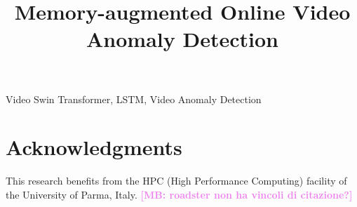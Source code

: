 \documentclass{article}
\title{Memory-augmented Online Video Anomaly Detection}
\newcommand{\mnote}[1]{\textcolor{violet}{\textbf{[MB: #1]}}}
\begin{document}
%
\maketitle
%

\begin{abstract}
    
\end{abstract}
\begin{keywords}
    Video Swin Transformer, LSTM, Video Anomaly Detection
\end{keywords}


%
%




\section*{Acknowledgments}
\noindent This research benefits from the HPC (High Performance Computing) facility of the University of Parma, Italy. \mnote{roadster non ha vincoli di citazione?}



{


%
}
\end{document}
